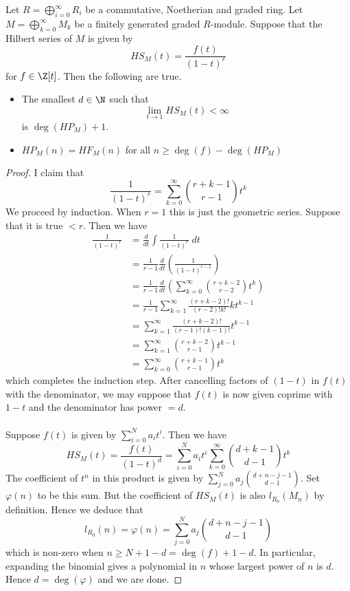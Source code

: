 \documentclass[a4paper]{article}
\begin{document}
\begin{lmm}{}{} Let $R=\bigoplus_{i=0}^\infty R_i$ be a commutative, Noetherian and graded ring. Let $M=\bigoplus_{k=0}^\infty M_k$ be a finitely generated graded $R$-module. Suppose that the Hilbert series of $M$ is given by $$HS_M(t)=\frac{f(t)}{(1-t)^r}$$ for $f\in\Z[t]$. Then the following are true. 
\begin{itemize}
\item The smallest $d\in\N$ such that $$\lim_{t\to 1}HS_M(t)<\infty$$ is $\deg(HP_M)+1$. 
\item $HP_M(n)=HF_M(n)$ for all $n\geq\deg(f)-\deg(HP_M)$
\end{itemize} \tcbline
\begin{proof}
I claim that $$\frac{1}{(1-t)^r}=\sum_{k=0}^\infty\binom{r+k-1}{r-1}t^k$$ We proceed by induction. When $r=1$ this is just the geometric series. Suppose that it is true $<r$. Then we have 
\begin{align*}
\frac{1}{(1-t)^r}&=\frac{d}{dt}\int\frac{1}{(1-t)^r}\;dt\\
&=\frac{1}{r-1}\frac{d}{dt}\left(\frac{1}{(1-t)^{r-1}}\right)\\
&=\frac{1}{r-1}\frac{d}{dt}\left(\sum_{k=0}^\infty\binom{r+k-2}{r-2}t^k\right)\\
&=\frac{1}{r-1}\sum_{k=1}^\infty\frac{(r+k-2)!}{(r-2)!k!}kt^{k-1}\\
&=\sum_{k=1}^\infty\frac{(r+k-2)!}{(r-1)!(k-1)!}t^{k-1}\\
&=\sum_{k=1}^\infty\binom{r+k-2}{r-1}t^{k-1}\\
&=\sum_{k=0}^\infty\binom{r+k-1}{r-1}t^k
\end{align*}
which completes the induction step. After cancelling factors of $(1-t)$ in $f(t)$ with the denominator, we may suppose that $f(t)$ is now given coprime with $1-t$ and the denominator has power $=d$. \\~\\

Suppose $f(t)$ is given by $\sum_{i=0}^Na_it^i$. Then we have $$HS_M(t)=\frac{f(t)}{(1-t)^d}=\sum_{i=0}^Na_it^i\sum_{k=0}^\infty\binom{d+k-1}{d-1}t^k$$ The coefficient of $t^n$ in this product is given by $\sum_{j=0}^Na_j\binom{d+n-j-1}{d-1}$. Set $\varphi(n)$ to be this sum. But the coefficient of $HS_M(t)$ is also $l_{R_0}(M_n)$ by definition. Hence we deduce that $$l_{R_0}(n)=\varphi(n)=\sum_{j=0}^Na_j\binom{d+n-j-1}{d-1}$$ which is non-zero when $n\geq N+1-d=\deg(f)+1-d$. In particular, expanding the binomial gives a polynomial in $n$ whose largest power of $n$ is $d$. Hence $d=\deg(\varphi)$ and we are done. 
\end{proof}
\end{lmm}
\end{document}
